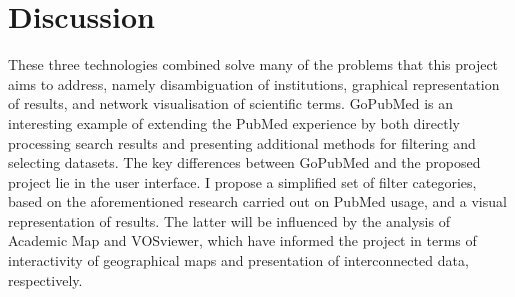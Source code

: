 \documentclass[PROP_AGutteridge_CS.tex]{subfiles}
\begin{document}
\section{Discussion}
These three technologies combined solve many of the problems that this project aims to address, namely disambiguation of institutions, graphical representation of results, and network visualisation of scientific terms. GoPubMed is an interesting example of extending the PubMed experience by both directly processing search results and presenting additional methods for filtering and selecting datasets. The key differences between GoPubMed and the proposed project lie in the user interface. I propose a simplified set of filter categories, based on the aforementioned research carried out on PubMed usage\cite{dogan}, and a visual representation of results. The latter will be influenced by the analysis of Academic Map and VOSviewer, which have informed the project in terms of interactivity of geographical maps and presentation of interconnected data, respectively. 
\end{document}

